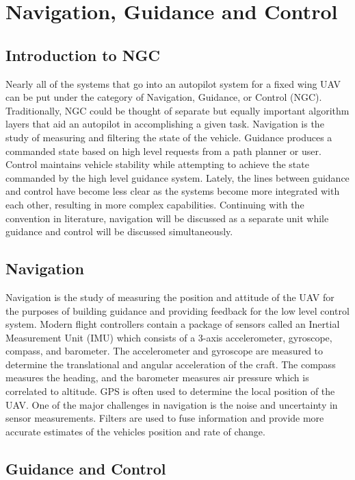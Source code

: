 \documentclass[numbered,pdftex]{ohio-etd}
\begin{document}
\section{Navigation, Guidance and Control}
\subsection{Introduction to NGC}
Nearly all of the systems that go into an autopilot system for a fixed wing UAV can be put under the category of Navigation, Guidance, or Control (NGC). Traditionally, NGC could be thought of separate but equally important algorithm layers that aid an autopilot in accomplishing a given task. Navigation is the study of measuring and filtering the state of the vehicle. Guidance produces a commanded state based on high level requests from a path planner or user. Control maintains vehicle stability while attempting to achieve the state commanded by the high level guidance system. Lately, the lines between guidance and control have become less clear as the systems become more integrated with each other, resulting in more complex capabilities. Continuing with the convention in literature, navigation will be discussed as a separate unit while guidance and control will be discussed simultaneously. 

\subsection{Navigation}

Navigation is the study of measuring the position and attitude of the UAV for the purposes of building guidance and providing feedback for the low level control system. Modern flight controllers contain a package of sensors called an Inertial Measurement Unit (IMU) which consists of a 3-axis accelerometer, gyroscope, compass, and barometer. The accelerometer and gyroscope are measured to determine the translational and angular acceleration of the craft. The compass measures the heading, and the barometer measures air pressure which is correlated to altitude. GPS is often used to determine the local position of the UAV. One of the major challenges in navigation is the noise and uncertainty in sensor measurements. Filters are used to fuse information and provide more accurate estimates of the vehicles position and rate of change.


\subsection{Guidance and Control}
\end{document}
